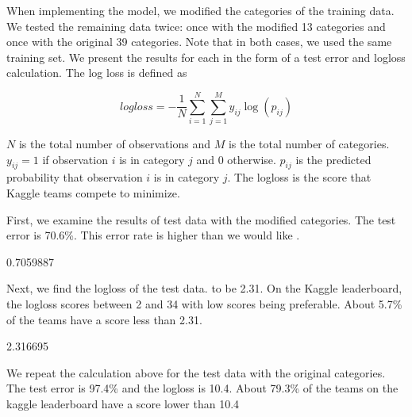 \documentclass[11pt]{article}
\begin{document}
When implementing the model, we modified the categories of the training data. We tested the remaining data twice: once with the modified 13 categories and once with the original 39 categories. Note that in both cases, we used the same training set.  We present the results for each in the form of a test error and logloss calculation. The log loss is defined as 

\[ logloss = - \frac{1}{N} \sum_{i=1}^N \sum_{j=1}^M y_{ij} \log (p_{ij}) \]

$N$ is the total number of observations and $M$ is the total number of categories. $y_{ij} = 1$ if  observation $i$ is in category $j$ and 0 otherwise. $p_{ij}$ is the predicted probability that observation $i$ is in category $j$. The logloss is the score that Kaggle teams compete to minimize.

First, we examine the results of test data with the modified categories. The test error is 70.6\%. This error rate is higher than we would like .


\begin{Schunk}
\begin{Soutput}
[1] 0.7059887
\end{Soutput}
\end{Schunk}

Next, we find the logloss of the test  data. to be 2.31. On the  Kaggle  leaderboard, the logloss scores between 2 and 34 with low scores being preferable. About 5.7\% of the teams have a score less than 2.31. 

\begin{Schunk}
\begin{Soutput}
[1] 2.316695
\end{Soutput}
\end{Schunk}

We repeat the calculation above for the test data with the original categories. The test error is 97.4\% and the logloss is 10.4. About 79.3\% of the teams on the kaggle leaderboard have a score lower than 10.4
\end{document}
